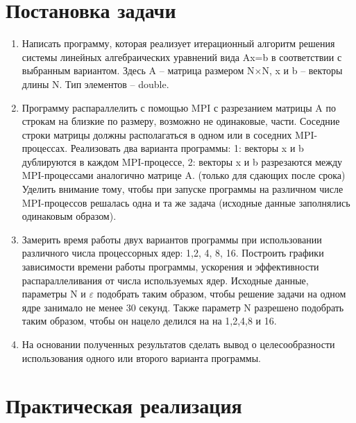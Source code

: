 \documentclass[a4paper, 14pt]{extarticle}
\begin{document}
\newpage

\tableofcontents

\newpage

\section{Постановка задачи}

\begin{enumerate}
	\item{Написать программу, которая реализует итерационный алгоритм
		решения системы линейных алгебраических уравнений вида Ax=b в
		соответствии с выбранным вариантом. Здесь A – матрица размером
		N×N, x и b – векторы длины N. Тип элементов – double.
		}

	\item{
		Программу распараллелить с помощью MPI с разрезанием матрицы A
		по строкам на близкие по размеру, возможно не одинаковые, части.
		Соседние строки матрицы должны располагаться в одном или в
		соседних MPI-процессах. Реализовать два варианта программы:
		1: векторы x и b дублируются в каждом MPI-процессе,
		2: векторы x и b разрезаются между MPI-процессами аналогично
		матрице A. (только для сдающих после срока)
		Уделить внимание тому, чтобы при запуске программы на различном
		числе MPI-процессов решалась одна и та же задача (исходные данные
		заполнялись одинаковым образом).
		}
		
	\item{Замерить время работы двух вариантов программы при использовании
		различного числа процессорных ядер: 1,2, 4, 8, 16. Построить графики
		зависимости времени работы программы, ускорения и эффективности
		распараллеливания от числа используемых ядер. Исходные данные,
		параметры N и $\varepsilon$ подобрать таким образом, чтобы решение задачи на
		одном ядре занимало не менее 30 секунд. Также параметр N разрешено
		подобрать таким образом, чтобы он нацело делился на на 1,2,4,8 и 16.
		}

	\item{На основании полученных результатов сделать вывод о
		целесообразности использования одного или второго варианта
		программы.
		}
\end{enumerate}


\newpage

\section{Практическая реализация}
\end{document}
